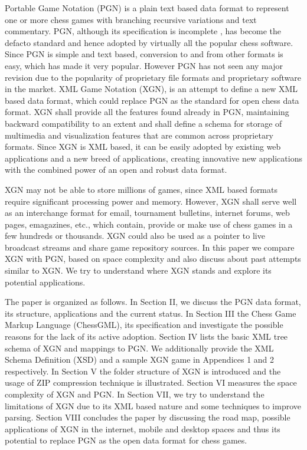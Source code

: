 \documentclass[conference]{IEEEtran}
\begin{document}
Portable Game Notation (PGN) is a plain text based data format to represent one or more chess games with branching recursive variations and text commentary. PGN, although its specification is incomplete \cite{ab01}
, has become the de\textendash facto standard and hence adopted by virtually all the popular chess software. Since PGN is simple and text based, conversion to and from other formats is easy, which has made it very popular. However PGN has not seen any major revision due to the popularity of proprietary file formats and proprietary software in the market. XML Game Notation (XGN), is an attempt to define a new XML based data format, which could replace PGN as the standard for open chess data format. XGN shall provide all the features found already in PGN, maintaining backward compatibility to an extent and shall define a schema for storage of multimedia and visualization features that are common across proprietary formats. Since XGN is XML based, it can be easily adopted by existing web applications and a new breed of applications, creating innovative new applications with the combined power of an open and robust data format.

XGN may not be able to store millions of games, since XML based formats require significant processing power and memory. However, XGN shall serve well as an interchange format for e\textendash mail, tournament bulletins, internet forums, web pages, e\textendash magazines, etc., which contain, provide or make use of chess games in a few hundreds or thousands. XGN could also be used as a pointer to live broadcast streams and share game repository sources. In this paper we compare XGN with PGN, based on space complexity and also discuss about past attempts similar to XGN. We try to understand where XGN stands and explore its potential applications.

The paper is organized as follows. In Section II, we discuss the PGN data format, its structure, applications and the current status. In Section III the Chess Game Markup Language (ChessGML), its specification and investigate the possible reasons for the lack of its active adoption. Section IV lists the basic XML tree schema of XGN and mappings to PGN. We additionally provide the XML Schema Definition (XSD) and a sample XGN game in Appendices 1 and 2 respectively. In Section V the folder structure of XGN is introduced and the usage of ZIP compression technique is illustrated. Section VI measures the space complexity of XGN and PGN. In Section VII, we try to understand the limitations of XGN due to its XML based nature and some techniques to improve parsing. Section VIII concludes the paper by discussing the road map, possible applications of XGN in the internet, mobile and desktop spaces and thus its potential to replace PGN as the open data format for chess games.
\end{document}
